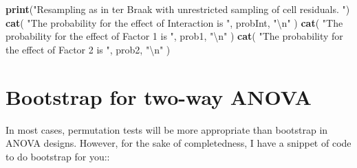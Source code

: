 \documentclass[
  12pt,
]{book}
\newenvironment{Shaded}{\begin{snugshade}}{\end{snugshade}}
\newcommand{\CharTok}[1]{\textcolor[rgb]{0.31,0.60,0.02}{#1}}
\newcommand{\KeywordTok}[1]{\textcolor[rgb]{0.13,0.29,0.53}{\textbf{#1}}}
\newcommand{\NormalTok}[1]{#1}
\newcommand{\StringTok}[1]{\textcolor[rgb]{0.31,0.60,0.02}{#1}}
\begin{document}
\begin{Shaded}
\begin{Highlighting}[]
\KeywordTok{print}\NormalTok{(}\StringTok{"Resampling as in ter Braak with unrestricted sampling}
\StringTok{of cell residuals. "}\NormalTok{)}
\KeywordTok{cat}\NormalTok{(}
  \StringTok{"The probability for the effect of Interaction is "}\NormalTok{,}
\NormalTok{  probInt, }\StringTok{"}\CharTok{\textbackslash{}n}\StringTok{"}
\NormalTok{)}
\KeywordTok{cat}\NormalTok{(}
  \StringTok{"The probability for the effect of Factor 1 is "}\NormalTok{,}
\NormalTok{  prob1, }\StringTok{"}\CharTok{\textbackslash{}n}\StringTok{"}
\NormalTok{)}
\KeywordTok{cat}\NormalTok{(}
  \StringTok{"The probability for the effect of Factor 2 is "}\NormalTok{,}
\NormalTok{  prob2, }\StringTok{"}\CharTok{\textbackslash{}n}\StringTok{"}
\NormalTok{)}
\end{Highlighting}
\end{Shaded}

\hypertarget{bootstrap-for-two-way-anova}{%
\section{Bootstrap for two-way ANOVA}\label{bootstrap-for-two-way-anova}}

In most cases, permutation tests will be more appropriate than bootstrap in ANOVA designs. However, for the sake of completedness, I have a snippet of code to do bootstrap for you::
\end{document}
